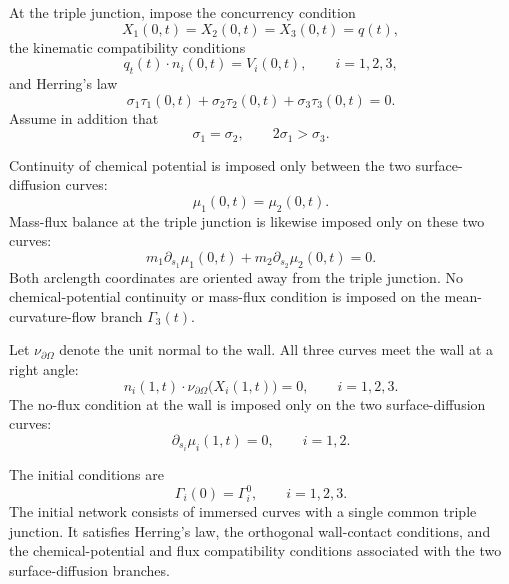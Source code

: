\documentclass[11pt,a4paper]{article}
\theoremstyle{definition}
\begin{document}
At the triple junction, impose the concurrency condition
\begin{equation}
  X_1(0,t)=X_2(0,t)=X_3(0,t)=q(t),
  \label{eq:concurrency}
\end{equation}
the kinematic compatibility conditions
\begin{equation}
  q_t(t)\cdot n_i(0,t)=V_i(0,t),
  \qquad i=1,2,3,
  \label{eq:kinematic}
\end{equation}
and Herring's law
\begin{equation}
  \sigma_1\tau_1(0,t)
  +\sigma_2\tau_2(0,t)
  +\sigma_3\tau_3(0,t)=0.
  \label{eq:herring}
\end{equation}
Assume in addition that
\begin{equation}
  \sigma_1=\sigma_2,
  \qquad
  2\sigma_1>\sigma_3.
\end{equation}

Continuity of chemical potential is imposed only between the two
surface-diffusion curves:
\begin{equation}
  \mu_1(0,t)=\mu_2(0,t).
  \label{eq:chemical-continuity}
\end{equation}
Mass-flux balance at the triple junction is likewise imposed only on these
two curves:
\begin{equation}
  m_1\partial_{s_1}\mu_1(0,t)
  +m_2\partial_{s_2}\mu_2(0,t)=0.
  \label{eq:flux-balance}
\end{equation}
Both arclength coordinates are oriented away from the triple junction. No
chemical-potential continuity or mass-flux condition is imposed on the
mean-curvature-flow branch $\Gamma_3(t)$.

Let $\nu_{\partial\Omega}$ denote the unit normal to the wall. All three
curves meet the wall at a right angle:
\begin{equation}
  n_i(1,t)\cdot
  \nu_{\partial\Omega}\bigl(X_i(1,t)\bigr)=0,
  \qquad i=1,2,3.
  \label{eq:contact-angle}
\end{equation}
The no-flux condition at the wall is imposed only on the two
surface-diffusion curves:
\begin{equation}
  \partial_{s_i}\mu_i(1,t)=0,
  \qquad i=1,2.
  \label{eq:wall-no-flux}
\end{equation}

The initial conditions are
\begin{equation}
  \Gamma_i(0)=\Gamma_i^0,
  \qquad i=1,2,3.
  \label{eq:initial-data}
\end{equation}
The initial network consists of immersed curves with a single common triple
junction. It satisfies Herring's law, the orthogonal wall-contact
conditions, and the chemical-potential and flux compatibility conditions
associated with the two surface-diffusion branches.
\end{document}
